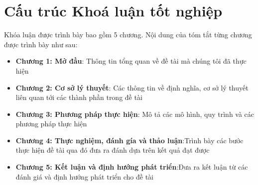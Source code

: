 \section{Cấu trúc Khoá luận tốt nghiệp}
\label{sec:CauTruc} Khóa luận được trình bày bao gồm 5 chương. Nội dung của tóm tắt
từng chương được trình bày như sau:
\begin{itemize}
    \item \textbf{Chương 1: Mở đầu}: Thông tin tổng quan về đề tài mà chúng tôi đã
        thực hiện

    \item \textbf{Chương 2: Cơ sở lý thuyết}: Các thông tin về định nghĩa, cơ sở
        lý thuyết liên quan tới các thành phần trong đề tài

    \item \textbf{Chương 3: Phương pháp thực hiện}: Mô tả các mô hình, quy trình
        và các phương pháp thực hiện

    \item \textbf{Chương 4: Thực nghiệm, đánh gía và thảo luận}:Trình bày các
        bước thực hiện đề tài qua đó đưa ra đánh dựa trên kết quả đạt được

    \item \textbf{Chương 5: Kết luận và định hướng phát triển}:Đưa ra kết luận
        từ các đánh giá và định hướng phát triển cho đề tài
\end{itemize}